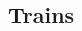 \documentclass{article}
\begin{document}
\begin{CJK}{UTF8}{min}














\section{Trains}


\end{CJK}
\end{document}
